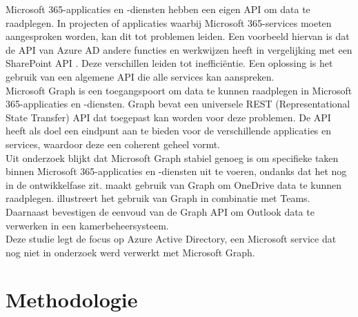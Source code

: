 Microsoft 365-applicaties en -diensten hebben een eigen API om data te raadplegen. In projecten of applicaties waarbij  Microsoft 365-services moeten aangesproken worden, kan dit tot problemen leiden. Een voorbeeld hiervan is dat de API van Azure AD andere functies en werkwijzen heeft in vergelijking met een SharePoint API \autocite{VanRousselt2021}. Deze verschillen leiden tot inefficiëntie. Een oplossing is het gebruik van een algemene API die alle services kan aanspreken. \\

Microsoft Graph is een toegangspoort om data te kunnen raadplegen in Microsoft 365-applicaties en -diensten. Graph bevat een universele REST (Representational State Transfer) API dat toegepast kan worden voor deze problemen. De API heeft als doel een eindpunt aan te bieden voor de verschillende applicaties en services, waardoor deze een coherent geheel vormt. \\

Uit onderzoek blijkt dat Microsoft Graph stabiel genoeg is om specifieke taken binnen Microsoft 365-applicaties en -diensten uit te voeren, ondanks dat het nog in de ontwikkelfase zit. \textcite{Hoefling2022} maakt gebruik van Graph om OneDrive data te kunnen raadplegen. \textcite{Jenkins2021} illustreert het gebruik van Graph in combinatie met Teams. Daarnaast bevestigen \textcite{Parsa2019} de eenvoud van de Graph API om Outlook data te verwerken in een kamerbeheersysteem. \\

Deze studie legt de focus op Azure Active Directory, een Microsoft service dat nog niet in onderzoek werd verwerkt met Microsoft Graph. 

\section{Methodologie}%
\label{sec:methodologie}

